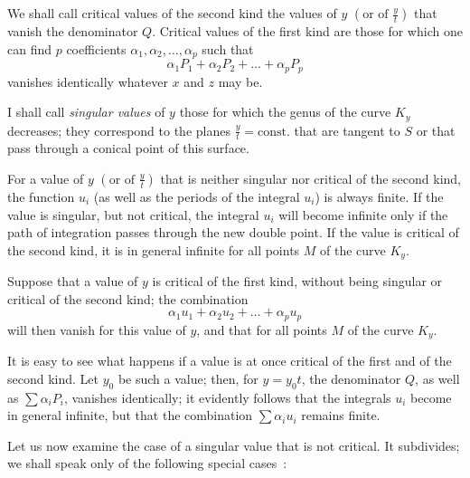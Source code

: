 \documentclass{article}
\begin{document}
We shall call critical values of the second kind the values of $y$ $\left(\text{or of } \frac{y}{t}\right)$ that vanish the denominator $Q$. Critical values of the first kind are those for which one can find $p$ coefficients $\alpha_{1}, \alpha_{2}, \ldots, \alpha_{p}$ such that
\[
\alpha_{1} P_{1} + \alpha_{2} P_{2} + \ldots + \alpha_{p} P_{p}
\]
vanishes identically whatever $x$ and $z$ may be.

I shall call \emph{singular values} of $y$ those for which the genus of the curve $K_{y}$ decreases; they correspond to the planes $\frac{y}{t} = \text{const.}$ that are tangent to $S$ or that pass through a conical point of this surface.

For a value of $y$ $\left(\text{or of } \frac{y}{t}\right)$ that is neither singular nor critical of the second kind, the function $u_{i}$ (as well as the periods of the integral $u_{i}$) is always finite. If the value is singular, but not critical, the integral $u_{i}$ will become infinite only if the path of integration passes through the new double point. If the value is critical of the second kind, it is in general infinite for all points $M$ of the curve $K_{y}$.

Suppose that a value of $y$ is critical of the first kind, without being singular or critical of the second kind; the combination
\[
\alpha_{1} u_{1} + \alpha_{2} u_{2} + \ldots + \alpha_{p} u_{p}
\]
will then vanish for this value of $y$, and that for all points $M$ of the curve $K_{y}$.

It is easy to see what happens if a value is at once critical of the first
and of the second kind. Let $y_{0}$ be such a value; then, for $y = y_{0} t$, the denominator $Q$, as well as $\displaystyle\sum \alpha_{i} P_{i}$, vanishes identically; it evidently follows that the integrals $u_{i}$ become in general infinite, but that the combination $\displaystyle\sum \alpha_{i} u_{i}$ remains finite.

Let us now examine the case of a singular value that is not critical. It subdivides; we shall speak only of the following special cases~:
\end{document}
